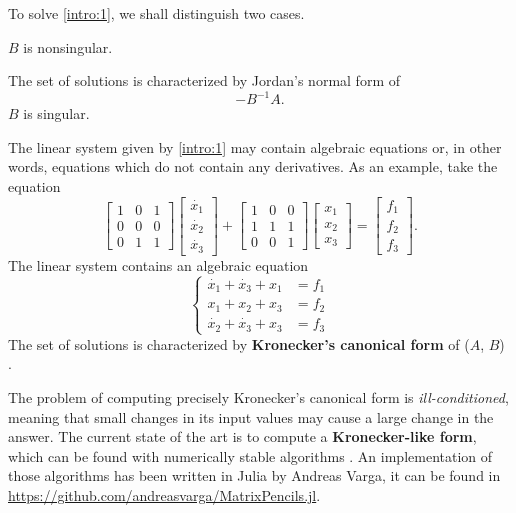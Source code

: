 To solve \eqref{intro:1}, we shall distinguish two cases.
\begin{cs}
	\case $B$ is nonsingular.

		The set of solutions is characterized by Jordan's normal form of \[-B^{-1}A.\]
	\case $B$ is singular.

		The linear system given by \eqref{intro:1} may contain algebraic equations or, in other words,
		equations which do not contain any derivatives. As an example, take the equation
		\[
			\begin{bmatrix}
				1 & 0 & 1 \\
				0 & 0 & 0 \\
				0 & 1 & 1
			\end{bmatrix}
			\begin{bmatrix}
				\dot{x_1} \\
				\dot{x_2} \\
				\dot{x_3}
			\end{bmatrix} + 
			\begin{bmatrix}
				1 & 0 & 0 \\
				1 & 1 & 1 \\
				0 & 0 & 1
			\end{bmatrix}
			\begin{bmatrix}
				x_1 \\
				x_2 \\
				x_3
			\end{bmatrix}
			= \begin{bmatrix}
				f_1 \\
				f_2 \\
				f_3
			\end{bmatrix}.
		\]
		The linear system contains an algebraic equation
		\begin{equation*}
			\left\{
				\begin{aligned}
					\dot{x_1} + \dot{x_3} + x_1 &= f_1 \\
					x_1 + x_2 + x_3 &= f_2 \\
					\dot{x_2} + \dot{x_3} + x_3 &= f_3
				\end{aligned}
			\right.
		\end{equation*}
		The set of solutions is characterized by \textbf{Kronecker's canonical form} of ($A$, $B$)
		\cite{gantmacher, kunkel-mehrmann}.
\end{cs}
\vspace{5mm}

The problem of computing precisely Kronecker's canonical form is \textit{ill-conditioned}, meaning
that small changes in its input values may cause a large change in the answer. The current state of the art is to
compute a \textbf{Kronecker-like form}, which can be found with numerically stable algorithms
\cite{beelen-van_dooren}. An implementation of those
algorithms has been written in Julia \cite{bezanson2017julia} by Andreas Varga, it can be found in
\url{https://github.com/andreasvarga/MatrixPencils.jl}.

